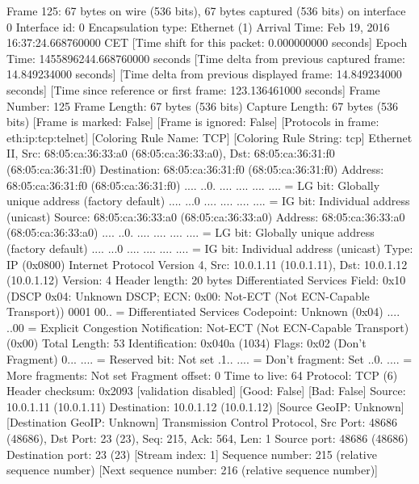 Frame 125: 67 bytes on wire (536 bits), 67 bytes captured (536 bits) on interface 0
    Interface id: 0
    Encapsulation type: Ethernet (1)
    Arrival Time: Feb 19, 2016 16:37:24.668760000 CET
    [Time shift for this packet: 0.000000000 seconds]
    Epoch Time: 1455896244.668760000 seconds
    [Time delta from previous captured frame: 14.849234000 seconds]
    [Time delta from previous displayed frame: 14.849234000 seconds]
    [Time since reference or first frame: 123.136461000 seconds]
    Frame Number: 125
    Frame Length: 67 bytes (536 bits)
    Capture Length: 67 bytes (536 bits)
    [Frame is marked: False]
    [Frame is ignored: False]
    [Protocols in frame: eth:ip:tcp:telnet]
    [Coloring Rule Name: TCP]
    [Coloring Rule String: tcp]
Ethernet II, Src: 68:05:ca:36:33:a0 (68:05:ca:36:33:a0), Dst: 68:05:ca:36:31:f0 (68:05:ca:36:31:f0)
    Destination: 68:05:ca:36:31:f0 (68:05:ca:36:31:f0)
        Address: 68:05:ca:36:31:f0 (68:05:ca:36:31:f0)
        .... ..0. .... .... .... .... = LG bit: Globally unique address (factory default)
        .... ...0 .... .... .... .... = IG bit: Individual address (unicast)
    Source: 68:05:ca:36:33:a0 (68:05:ca:36:33:a0)
        Address: 68:05:ca:36:33:a0 (68:05:ca:36:33:a0)
        .... ..0. .... .... .... .... = LG bit: Globally unique address (factory default)
        .... ...0 .... .... .... .... = IG bit: Individual address (unicast)
    Type: IP (0x0800)
Internet Protocol Version 4, Src: 10.0.1.11 (10.0.1.11), Dst: 10.0.1.12 (10.0.1.12)
    Version: 4
    Header length: 20 bytes
    Differentiated Services Field: 0x10 (DSCP 0x04: Unknown DSCP; ECN: 0x00: Not-ECT (Not ECN-Capable Transport))
        0001 00.. = Differentiated Services Codepoint: Unknown (0x04)
        .... ..00 = Explicit Congestion Notification: Not-ECT (Not ECN-Capable Transport) (0x00)
    Total Length: 53
    Identification: 0x040a (1034)
    Flags: 0x02 (Don't Fragment)
        0... .... = Reserved bit: Not set
        .1.. .... = Don't fragment: Set
        ..0. .... = More fragments: Not set
    Fragment offset: 0
    Time to live: 64
    Protocol: TCP (6)
    Header checksum: 0x2093 [validation disabled]
        [Good: False]
        [Bad: False]
    Source: 10.0.1.11 (10.0.1.11)
    Destination: 10.0.1.12 (10.0.1.12)
    [Source GeoIP: Unknown]
    [Destination GeoIP: Unknown]
Transmission Control Protocol, Src Port: 48686 (48686), Dst Port: 23 (23), Seq: 215, Ack: 564, Len: 1
    Source port: 48686 (48686)
    Destination port: 23 (23)
    [Stream index: 1]
    Sequence number: 215    (relative sequence number)
    [Next sequence number: 216    (relative sequence number)]
